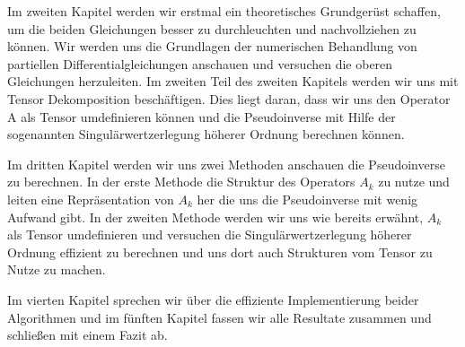 Im zweiten Kapitel werden wir erstmal ein theoretisches Grundgerüst schaffen, um die beiden Gleichungen besser zu durchleuchten und nachvollziehen zu können. Wir werden uns die Grundlagen der numerischen Behandlung von partiellen Differentialgleichungen anschauen und versuchen die oberen Gleichungen herzuleiten.
Im zweiten Teil des zweiten Kapitels werden wir uns mit Tensor Dekomposition beschäftigen. Dies liegt daran, dass wir uns den Operator A als Tensor umdefinieren können und die Pseudoinverse mit Hilfe der sogenannten Singulärwertzerlegung höherer Ordnung berechnen können.

Im dritten Kapitel werden wir uns zwei Methoden anschauen die Pseudoinverse zu berechnen. In der erste Methode die Struktur des Operators $A_k$ zu nutze und leiten eine Repräsentation von $A_k$ her die uns die Pseudoinverse mit wenig Aufwand gibt. In der zweiten Methode werden wir uns wie bereits erwähnt, $A_k$ als Tensor umdefinieren und versuchen die Singulärwertzerlegung höherer Ordnung effizient zu berechnen und uns dort auch Strukturen vom Tensor zu Nutze zu machen.

Im vierten Kapitel sprechen wir über die effiziente Implementierung beider Algorithmen und im fünften Kapitel fassen wir alle Resultate zusammen und schließen mit einem Fazit ab.




